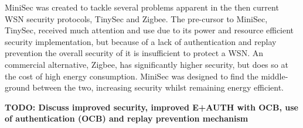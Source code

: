 MiniSec was created to tackle several problems apparent in the then current WSN security protocols, TinySec and Zigbee. The pre-cursor to MiniSec, TinySec, received much attention and use due to its power and resource efficient security implementation, but because of a lack of authentication and replay prevention the overall security of it is insufficient to protect a WSN. An commercial alternative, Zigbee, has significantly higher security, but does so at the cost of high energy consumption. MiniSec was designed to find the middle-ground between the two, increasing security whilst remaining energy efficient. 

\textbf{TODO: Discuss improved security, improved E+AUTH with OCB, use of authentication (OCB) and replay prevention mechanism}